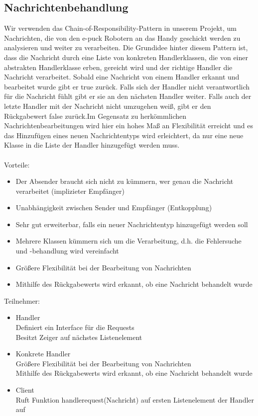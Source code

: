 \documentclass[10pt,a4paper]{article}
\begin{document}
  		\subsection{Nachrichtenbehandlung}
  			Wir verwenden das Chain-of-Responsibility-Pattern in unserem Projekt, um Nachrichten, die von den e-puck Robotern an das Handy
  			geschickt werden zu analysieren und weiter zu verarbeiten. Die Grundidee hinter diesem Pattern ist, dass die Nachricht durch eine Liste
  			von konkreten Handlerklassen, die von einer abstrakten Handlerklasse erben, gereicht wird und der richtige Handler die Nachricht
  			verarbeitet. Sobald eine Nachricht von einem Handler erkannt und bearbeitet wurde gibt er true zurück. Falls sich der Handler nicht
  			verantwortlich für die Nachricht fühlt gibt er sie an den nächsten Handler weiter. Falls auch der letzte Handler mit der Nachricht nicht
  			umzugehen weiß, gibt er den Rückgabewert false zurück.Im Gegensatz zu herkömmlichen Nachrichtenbearbeitungen wird hier ein
  			hohes Maß an Flexibilität erreicht und es das Hinzufügen eines neuen Nachrichtentyps wird erleichtert, da nur eine neue Klasse in die
  			Liste der Handler hinzugefügt werden muss. \\ \\
  			Vorteile:
  			\begin{itemize}
  				\item Der Absender braucht sich nicht zu kümmern, wer genau die Nachricht verarbeitet (implizieter Empfänger)
  				\item Unabhängigkeit zwischen Sender und Empfänger (Entkopplung)
  				\item Sehr gut erweiterbar, falls ein neuer Nachrichtentyp hinzugefügt werden soll
  				\item Mehrere Klassen kümmern sich um die Verarbeitung, d.h. die Fehlersuche und -behandlung wird vereinfacht
  				\item Größere Flexibilität bei der Bearbeitung von Nachrichten
  				\item Mithilfe des Rückgabewerts wird erkannt, ob eine Nachricht behandelt wurde
  			\end{itemize}  
  			Teilnehmer:
   			\begin{itemize}
  				\item Handler\\Definiert ein Interface für die Requests\\Besitzt Zeiger auf nächstes Listenelement
  				\item Konkrete Handler\\Größere Flexibilität bei der Bearbeitung von Nachrichten\\
  					Mithilfe des Rückgabewerts wird erkannt, ob eine Nachricht behandelt wurde
  				\item Client \\ Ruft Funktion handlerequest(Nachricht) auf ersten Listenelement der Handler auf
  			\end{itemize}   	
  			
\end{document}
